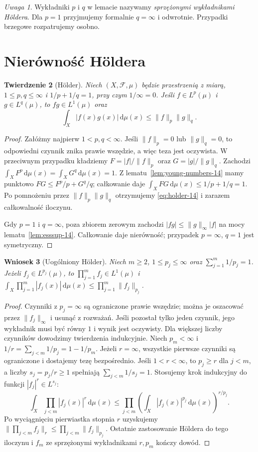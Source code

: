\documentclass[11pt,a4paper,oneside]{book}
\numberwithin{equation}{chapter}
\theoremstyle{plain}
\newtheorem{twierdzenie}{Twierdzenie}[chapter]
\newtheorem{wniosek}[twierdzenie]{Wniosek}
\theoremstyle{definition}
\theoremstyle{remark}
\newtheorem{uwaga}[twierdzenie]{Uwaga}
\begin{document}
\begin{uwaga}
Wykładniki $p$ i $q$ w lemacie nazywamy
\emph{sprzężonymi wykładnikami Höldera}.
Dla $p=1$ przyjmujemy formalnie $q=\infty$ i odwrotnie.
Przypadki brzegowe rozpatrujemy osobno.
\end{uwaga}

\section{Nierówność Höldera}
\begin{twierdzenie}[Hölder]
\label{thm:holder-14}
Niech $(X,\mathcal F,\mu)$ będzie przestrzenią z miarą,
$1\le p,q\le\infty$ i $1/p+1/q=1$, przy czym $1/\infty=0$.
Jeśli $f\in L^p(\mu)$ i $g\in L^q(\mu)$,
to $fg\in L^1(\mu)$ oraz
\begin{equation}\label{eq:holder-14}
\int_X|f(x)g(x)|\,\mathrm d\mu(x)
\le\|f\|_p\|g\|_q.
\end{equation}
\end{twierdzenie}
\begin{proof}
Załóżmy najpierw $1<p,q<\infty$.
Jeśli $\|f\|_p=0$ lub $\|g\|_q=0$,
to odpowiedni czynnik znika prawie wszędzie,
a więc teza jest oczywista. W przeciwnym przypadku
kładziemy $F=|f|/\|f\|_p$ oraz $G=|g|/\|g\|_q$.
Zachodzi $\int_XF^p\,\mathrm d\mu(x)=
\int_XG^q\,\mathrm d\mu(x)=1$.
Z lematu~\ref{lem:young-numbers-14} mamy punktowo
$FG\le F^p/p+G^q/q$; całkowanie daje
$\int_XFG\,\mathrm d\mu(x)\le1/p+1/q=1$.
Po pomnożeniu przez $\|f\|_p\|g\|_q$ otrzymujemy
\eqref{eq:holder-14} i zarazem całkowalność iloczynu.

Gdy $p=1$ i $q=\infty$, poza zbiorem zerowym zachodzi
$|fg|\le\|g\|_\infty|f|$ na mocy
lematu~\ref{lem:esssup-14}. Całkowanie daje nierówność;
przypadek $p=\infty$, $q=1$ jest symetryczny.
\end{proof}

\begin{wniosek}[Uogólniony Hölder]
\label{cor:generalized-holder-14}
Niech $m\ge2$, $1\le p_j\le\infty$ oraz
$\sum_{j=1}^m1/p_j=1$. Jeżeli $f_j\in L^{p_j}(\mu)$,
to $\prod_{j=1}^m f_j\in L^1(\mu)$ i
$\int_X\prod_{j=1}^m|f_j(x)|\,\mathrm d\mu(x)
\le\prod_{j=1}^m\|f_j\|_{p_j}$.
\end{wniosek}
\begin{proof}
Czynniki z $p_j=\infty$ są ograniczone prawie wszędzie;
można je oszacować przez $\|f_j\|_\infty$ i usunąć
z rozważań. Jeśli pozostał tylko jeden czynnik,
jego wykładnik musi być równy $1$ i wynik jest oczywisty.
Dla większej liczby czynników dowodzimy twierdzenia indukcyjnie.
Niech $p_m<\infty$ i $1/r=\sum_{j<m}1/p_j=1-1/p_m$.
Jeżeli $r=\infty$, wszystkie pierwsze czynniki
są ograniczone i dostajemy tezę bezpośrednio.
Jeśli $1<r<\infty$, to $p_j\ge r$ dla $j<m$,
a liczby $s_j=p_j/r\ge1$ spełniają
$\sum_{j<m}1/s_j=1$. Stosujemy krok indukcyjny
do funkcji $|f_j|^r\in L^{s_j}$:
\[
\int_X\prod_{j<m}|f_j(x)|^r\,\mathrm d\mu(x)
\le\prod_{j<m}\left(\int_X|f_j(x)|^{p_j}\,
\mathrm d\mu(x)\right)^{r/p_j}.
\]
Po wyciągnięciu pierwiastka stopnia $r$ uzyskujemy
$\|\prod_{j<m}f_j\|_r\le\prod_{j<m}\|f_j\|_{p_j}$.
Ostatnie zastosowanie Höldera do tego iloczynu i $f_m$
ze sprzężonymi wykładnikami $r,p_m$ kończy dowód.
\end{proof}
\end{document}
